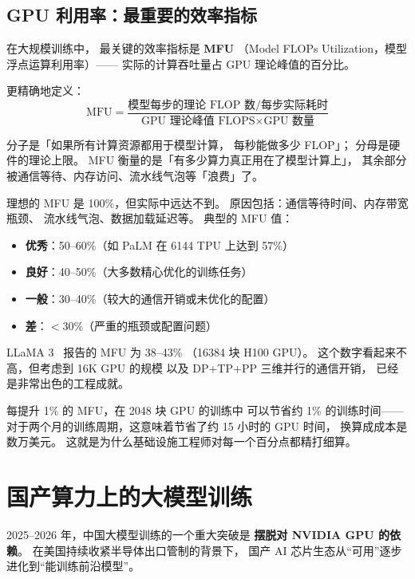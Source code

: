\subsection{GPU 利用率：最重要的效率指标}

在大规模训练中，
最关键的效率指标是 \textbf{MFU}
（Model FLOPs Utilization，模型浮点运算利用率）——
实际的计算吞吐量占 GPU 理论峰值的百分比。

更精确地定义：
\begin{equation}
  \mathrm{MFU} = \frac{\text{模型每步的理论 FLOP 数} / \text{每步实际耗时}}
                      {\text{GPU 理论峰值 FLOPS} \times \text{GPU 数量}}
  \label{eq:mfu}
\end{equation}

分子是「如果所有计算资源都用于模型计算，
每秒能做多少 FLOP」；
分母是硬件的理论上限。
MFU 衡量的是「有多少算力真正用在了模型计算上」，
其余部分被通信等待、内存访问、流水线气泡等「浪费」了。

理想的 MFU 是 100\%，但实际中远达不到。
原因包括：通信等待时间、内存带宽瓶颈、
流水线气泡、数据加载延迟等。
典型的 MFU 值：
\begin{itemize}[noitemsep]
  \item \textbf{优秀}：50--60\%（如 PaLM 在 6144 TPU 上达到 57\%）
  \item \textbf{良好}：40--50\%（大多数精心优化的训练任务）
  \item \textbf{一般}：30--40\%（较大的通信开销或未优化的配置）
  \item \textbf{差}：$<$30\%（严重的瓶颈或配置问题）
\end{itemize}

LLaMA 3~\cite{dubey2024llama3} 报告的 MFU 为 38--43\%
（16384 块 H100 GPU）。
这个数字看起来不高，但考虑到 16K GPU 的规模
以及 DP+TP+PP 三维并行的通信开销，
已经是非常出色的工程成就。

每提升 1\% 的 MFU，在 2048 块 GPU 的训练中
可以节省约 1\% 的训练时间——
对于两个月的训练周期，这意味着节省了约 15 小时的 GPU 时间，
换算成成本是数万美元。
这就是为什么基础设施工程师对每一个百分点都精打细算。

\section{国产算力上的大模型训练}
\label{sec:domestic-training}

2025--2026 年，中国大模型训练的一个重大突破是
\textbf{摆脱对 NVIDIA GPU 的依赖}。
在美国持续收紧半导体出口管制的背景下，
国产 AI 芯片生态从``可用''逐步进化到``能训练前沿模型''。

